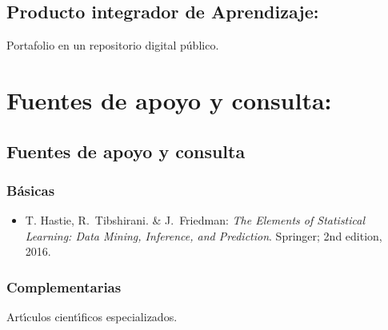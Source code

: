 \documentclass[10 pt]{article}
\begin{document}
\subsection{Producto integrador de Aprendizaje:} Portafolio en un
repositorio digital p\'{u}blico. %

\section{Fuentes de apoyo y consulta:}
\subsection{Fuentes de apoyo y consulta}
\subsubsection{B\'{a}sicas}

\begin{itemize}[itemsep=0em]

  
\item{T. {\sc Hastie}, R.\ {\sc Tibshirani}. \& J.\ {\sc Friedman}: {\em
      The Elements of Statistical Learning: Data Mining, Inference,
      and Prediction}. Springer; 2nd edition, 2016.}
  
\end{itemize}

\subsubsection{Complementarias}

Art\'{\i}culos cient\'{\i}ficos especializados.

\label{final} %


\end{document}
